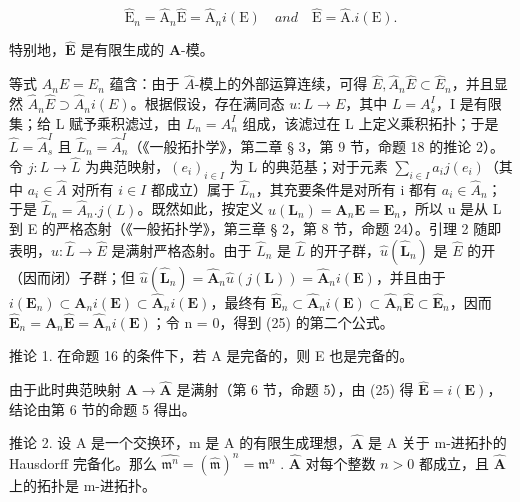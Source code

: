 \[
\hat {\mathrm{E}} _ {n} = \hat {\mathrm{A}} _ {n} \hat {\mathrm{E}} = \hat {\mathrm{A}} _ {n} i (\mathrm{E}) \quad a n d \quad \hat {\mathrm{E}} = \hat {\mathrm{A}}. i (\mathrm{E}).\tag{25}
\]

特别地，\(\hat{\mathbf{E}}\) 是有限生成的 \(\hat{\mathbf{A}}\)-模。

等式 \(A_{n}E = E_{n}\) 蕴含：由于 \(\hat{A}\)-模上的外部运算连续，可得 \(\hat{E}, \hat{A}_{n}\hat{E} \subset \hat{E}_{n}\)，并且显然 \(\hat{A}_{n}\hat{E} \supset \hat{A}_{n}i(E)\)。根据假设，存在满同态 \(u: L \to E\)，其中 \(L = A_{s}^{I}\)，I 是有限集；给 L 赋予乘积滤过，由 \(L_{n} = A_{n}^{I}\) 组成，该滤过在 L 上定义乘积拓扑；于是 \(\hat{L} = \hat{A}_{s}^{I}\) 且 \(\hat{L}_{n} = \hat{A}_{n}^{I}\)（《一般拓扑学》，第二章 § 3，第 9 节，命题 18 的推论 2）。令 \(j: L \to \hat{L}\) 为典范映射，\((e_{i})_{i \in I}\) 为 L 的典范基；对于元素 \(\sum_{i \in I} a_{i}j(e_{i})\)（其中 \(a_{i} \in \hat{A}\) 对所有 \(i \in I\) 都成立）属于 \(\hat{L}_{n}\)，其充要条件是对所有 i 都有 \(a_{i} \in \hat{A}_{n}\)；于是 \(\hat{L}_{n} = \hat{A}_{n}.j(L)\)。既然如此，按定义 \(u(\mathbf{L}_{n}) = \mathbf{A}_{n}\mathbf{E} = \mathbf{E}_{n}\)，所以 u 是从 L 到 E 的严格态射（《一般拓扑学》，第三章 § 2，第 8 节，命题 24）。引理 2 随即表明，\(\hat{u}: \hat{L} \to \hat{E}\) 是满射严格态射。由于 \(\hat{L}_{n}\) 是 \(\hat{L}\) 的开子群，\(\hat{u}(\hat{\mathbf{L}}_{n})\) 是 \(\hat{E}\) 的开（因而闭）子群；但 \(\hat{u}(\hat{\mathbf{L}}_{n}) = \hat{\mathbf{A}}_{n}\hat{u}(j(\mathbf{L})) = \hat{\mathbf{A}}_{n}i(\mathbf{E})\)，并且由于 \(i(\mathbf{E}_{n}) \subset \mathbf{A}_{n}i(\mathbf{E}) \subset \hat{\mathbf{A}}_{n}i(\mathbf{E})\)，最终有 \(\hat{\mathbf{E}}_{n} \subset \hat{\mathbf{A}}_{n}i(\mathbf{E}) \subset \hat{\mathbf{A}}_{n}\hat{\mathbf{E}} \subset \hat{\mathbf{E}}_{n}\)，因而 \(\hat{\mathbf{E}}_{n} = \hat{\mathbf{A}}_{n}\hat{\mathbf{E}} = \hat{\mathbf{A}}_{n}i(\mathbf{E})\)；令 n = 0，得到 (25) 的第二个公式。

推论 1. 在命题 16 的条件下，若 A 是完备的，则 E 也是完备的。

由于此时典范映射 \(\mathbf{A} \to \hat{\mathbf{A}}\) 是满射（第 6 节，命题 5），由 (25) 得 \(\hat{\mathbf{E}} = i(\mathbf{E})\)，结论由第 6 节的命题 5 得出。

推论 2. 设 A 是一个交换环，m 是 A 的有限生成理想，\(\hat{\mathbf{A}}\) 是 A 关于 m-进拓扑的 Hausdorff 完备化。那么 \(\widehat{\mathfrak{m}^n} = (\hat{\mathfrak{m}})^n = \mathfrak{m}^n\) . \(\hat{\mathbf{A}}\) 对每个整数 \(n > 0\) 都成立，且 \(\hat{\mathbf{A}}\) 上的拓扑是 m-进拓扑。

